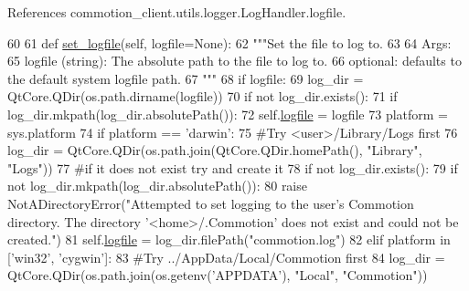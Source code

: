 References commotion\+\_\+client.\+utils.\+logger.\+Log\+Handler.\+logfile.


\begin{DoxyCode}
60 
61     \textcolor{keyword}{def }\hyperlink{classcommotion__client_1_1utils_1_1logger_1_1LogHandler_a1d1431f7384b19dc25e176361b7eeb23}{set\_logfile}(self, logfile=None):
62         \textcolor{stringliteral}{"""Set the file to log to.}
63 \textcolor{stringliteral}{        }
64 \textcolor{stringliteral}{        Args:}
65 \textcolor{stringliteral}{        logfile (string): The absolute path to the file to log to.}
66 \textcolor{stringliteral}{          optional: defaults to the default system logfile path.}
67 \textcolor{stringliteral}{        """}
68         \textcolor{keywordflow}{if} logfile:
69             log\_dir = QtCore.QDir(os.path.dirname(logfile))
70             \textcolor{keywordflow}{if} \textcolor{keywordflow}{not} log\_dir.exists():
71                 \textcolor{keywordflow}{if} log\_dir.mkpath(log\_dir.absolutePath()):
72                     self.\hyperlink{classcommotion__client_1_1utils_1_1logger_1_1LogHandler_a92d313ddde96b6e1765514f4596f26f2}{logfile} = logfile
73         platform = sys.platform
74         \textcolor{keywordflow}{if} platform == \textcolor{stringliteral}{'darwin'}:
75             \textcolor{comment}{#Try <user>/Library/Logs first}
76             log\_dir = QtCore.QDir(os.path.join(QtCore.QDir.homePath(), \textcolor{stringliteral}{"Library"}, \textcolor{stringliteral}{"Logs"}))
77             \textcolor{comment}{#if it does not exist try and create it}
78             \textcolor{keywordflow}{if} \textcolor{keywordflow}{not} log\_dir.exists():
79                 \textcolor{keywordflow}{if} \textcolor{keywordflow}{not} log\_dir.mkpath(log\_dir.absolutePath()):
80                     \textcolor{keywordflow}{raise} NotADirectoryError(\textcolor{stringliteral}{"Attempted to set logging to the user's Commotion directory.
       The directory '<home>/.Commotion' does not exist and could not be created."})
81             self.\hyperlink{classcommotion__client_1_1utils_1_1logger_1_1LogHandler_a92d313ddde96b6e1765514f4596f26f2}{logfile} = log\_dir.filePath(\textcolor{stringliteral}{"commotion.log"})
82         \textcolor{keywordflow}{elif} platform \textcolor{keywordflow}{in} [\textcolor{stringliteral}{'win32'}, \textcolor{stringliteral}{'cygwin'}]:
83             \textcolor{comment}{#Try ../AppData/Local/Commotion first}
84             log\_dir = QtCore.QDir(os.path.join(os.getenv(\textcolor{stringliteral}{'APPDATA'}), \textcolor{stringliteral}{"Local"}, \textcolor{stringliteral}{"Commotion"}))

\end{DoxyCode}
